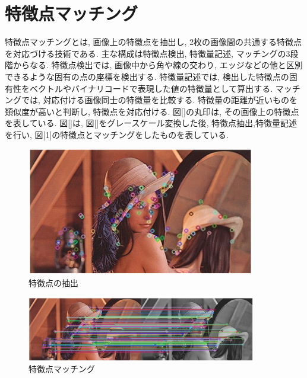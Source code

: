 \documentclass[a4paper,12pt]{jsreport}
\begin{document}
\section{特徴点マッチング}
特徴点マッチングとは, 画像上の特徴点を抽出し, 2枚の画像間の共通する特徴点を対応づける技術である. 主な構成は特徴点検出, 特徴量記述, マッチングの3段階からなる. 特徴点検出では, 画像中から角や線の交わり, エッジなどの他と区別できるような固有の点の座標を検出する. 特徴量記述では, 検出した特徴点の固有性をベクトルやバイナリコードで表現した値の特徴量として算出する. マッチングでは, 対応付ける画像同士の特徴量を比較する. 特徴量の距離が近いものを類似度が高いと判断し, 特徴点を対応付ける. 図[]の丸印は, その画像上の特徴点を表している. 図[]は, 図[]をグレースケール変換した後, 特徴点抽出,特徴量記述を行い, 図[1]の特徴点とマッチングをしたものを表している. 
\begin{figure}[h]
  \begin{center}
    \includegraphics[width=10cm]{./lena_featurepoints.png}
    \caption{特徴点の抽出}
  \end{center}
\end{figure}

\begin{figure}[h]
  \begin{center}
    \includegraphics[width=10cm]{./features_match.png}
    \caption{特徴点マッチング}
  \end{center}
\end{figure}
\end{document}
